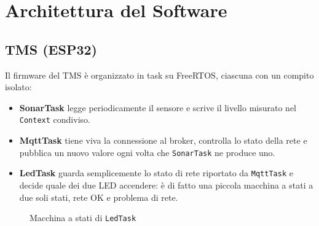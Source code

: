 \documentclass[a4paper,12pt]{report}
\begin{document}
\chapter{Architettura del Software}



\section{TMS (ESP32)}
Il firmware del TMS è organizzato in task su FreeRTOS, ciascuna con un compito isolato:

\begin{itemize}
	\item \textbf{SonarTask} legge periodicamente il sensore e scrive il livello misurato nel \texttt{Context} condiviso.
	\item \textbf{MqttTask} tiene viva la connessione al broker, controlla lo stato della rete e pubblica un nuovo valore ogni volta che \texttt{SonarTask} ne produce uno.
	\item \textbf{LedTask} guarda semplicemente lo stato di rete riportato da \texttt{MqttTask} e decide quale dei due LED accendere: è di fatto una piccola macchina a stati a due soli stati, rete OK e problema di rete.
\end{itemize}
\begin{figure}[H]
	\centering
	
	\caption{Macchina a stati di \texttt{LedTask}}
	\label{fig:tms-ledtask}
\end{figure}
\newpage
\end{document}
